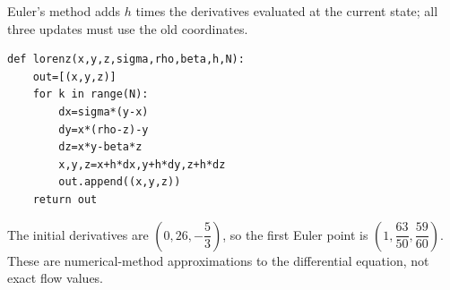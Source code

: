 Euler's method adds $h$ times the derivatives evaluated at the current state; all three updates must use the old coordinates.\begin{verbatim}
def lorenz(x,y,z,sigma,rho,beta,h,N):
    out=[(x,y,z)]
    for k in range(N):
        dx=sigma*(y-x)
        dy=x*(rho-z)-y
        dz=x*y-beta*z
        x,y,z=x+h*dx,y+h*dy,z+h*dz
        out.append((x,y,z))
    return out
\end{verbatim}
The initial derivatives are $(0,26,-\dfrac{5}{3})$, so the first Euler point is $\boxed{(1,\dfrac{63}{50},\dfrac{59}{60})}$. These are numerical-method approximations to the differential equation, not exact flow values.
